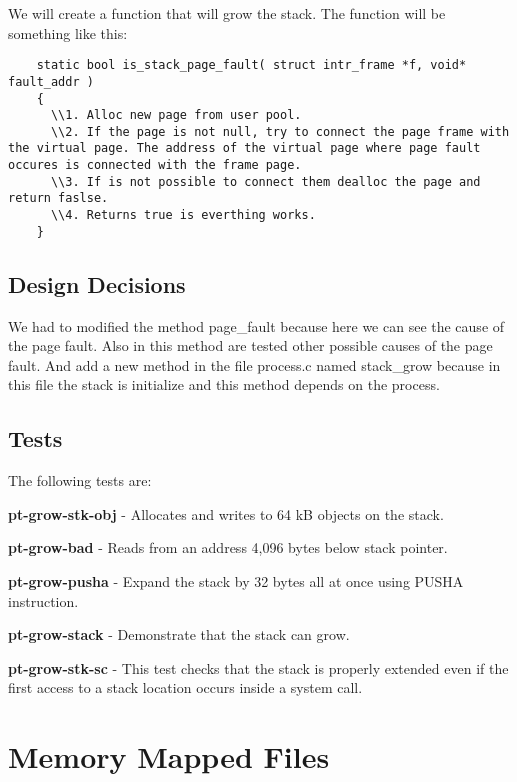 We will create a function that will grow the stack. The function will be something like this:

\begin{lstlisting}
    static bool is_stack_page_fault( struct intr_frame *f, void* fault_addr )
    {
      \\1. Alloc new page from user pool.
      \\2. If the page is not null, try to connect the page frame with the virtual page. The address of the virtual page where page fault occures is connected with the frame page.
      \\3. If is not possible to connect them dealloc the page and return faslse.
      \\4. Returns true is everthing works.
    }
\end{lstlisting}


\subsection{Design Decisions}

We had to modified the method page\_fault because here we can see the cause of the page fault. Also in this method are tested other possible causes of the page fault. And add a new method in the file process.c named stack\_grow because in this file the stack is initialize and this method depends on the process.


\subsection{Tests}

The following tests are: 

\textbf{pt-grow-stk-obj} - Allocates and writes to 64 kB objects on the stack. 

\textbf{pt-grow-bad} - Reads from an address 4,096 bytes below stack pointer. 

\textbf{pt-grow-pusha} - Expand the stack by 32 bytes all at once using PUSHA instruction. 

\textbf{pt-grow-stack} - Demonstrate that the stack can grow. 

\textbf{pt-grow-stk-sc} - This test checks that the stack is properly extended even if the first access to a stack location occurs inside a system call. 



\section{Memory Mapped Files}
